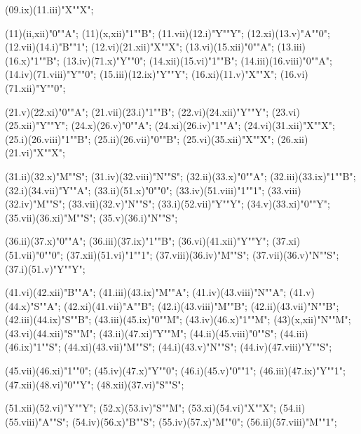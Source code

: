 \MTinput(09.ix)(11.iii)"X""X";

\MTauto(11)(ii,xii)"0""A";
\MTauto(11)(x,xii)"1""B";
\MTinput(11.vii)(12.i)"Y""Y";
\MTinput(12.xi)(13.v)"A""0";
\MTinput(12.vii)(14.i)"B""1";
\MTinput(12.vi)(21.xii)"X""X";
\MTinput(13.vi)(15.xii)"0""A";
\MTinput(13.iii)(16.x)"1""B";
\MTinput(13.iv)(71.x)"Y""0";
\MTinput(14.xii)(15.vi)"1""B";
\MTinput(14.iii)(16.viii)"0""A";
\MTinput(14.iv)(71.viii)"Y""0";
\MTinput(15.iii)(12.ix)"Y""Y";
\MTinput(16.xi)(11.v)"X""X";
\MTinput(16.vi)(71.xii)"Y""0";

\MTinput(21.v)(22.xi)"0""A";
\MTinput(21.vii)(23.i)"1""B";
\MTinput(22.vi)(24.xii)"Y""Y";
\MTinput(23.vi)(25.xii)"Y""Y";
\MTinput(24.x)(26.v)"0""A";
\MTinput(24.xi)(26.iv)"1""A";
\MTinput(24.vi)(31.xii)"X""X";
\MTinput(25.i)(26.viii)"1""B";
\MTinput(25.ii)(26.vii)"0""B";
\MTinput(25.vi)(35.xii)"X""X";
\MTinput(26.xii)(21.vi)"X""X";

\MTinput(31.ii)(32.x)"M""S";
\MTinput(31.iv)(32.viii)"N""S";
\MTinput(32.ii)(33.x)"0""A";
\MTinput(32.iii)(33.ix)"1""B";
\MTinput(32.i)(34.vii)"Y""A";
\MTinput(33.ii)(51.x)"0""0";
\MTinput(33.iv)(51.viii)"1""1";
\MTinput(33.viii)(32.iv)"M""S";
\MTinput(33.vii)(32.v)"N""S";
\MTinput(33.i)(52.vii)"Y""Y";
\MTinput(34.v)(33.xi)"0""Y";
\MTinput(35.vii)(36.xi)"M""S";
\MTinput(35.v)(36.i)"N""S";

\MTinput(36.ii)(37.x)"0""A";
\MTinput(36.iii)(37.ix)"1""B";
\MTinput(36.vi)(41.xii)"Y""Y";
\MTinput(37.xi)(51.vii)"0""0";
\MTinput(37.xii)(51.vi)"1""1";
\MTinput(37.viii)(36.iv)"M""S";
\MTinput(37.vii)(36.v)"N""S";
\MTinput(37.i)(51.v)"Y""Y";

\MTinput(41.vi)(42.xii)"B""A";
\MTinput(41.iii)(43.ix)"M""A";
\MTinput(41.iv)(43.viii)"N""A";
\MTinput(41.v)(44.x)"S""A";
\MTinput(42.xi)(41.vii)"A""B";
\MTinput(42.i)(43.viii)"M""B";
\MTinput(42.ii)(43.vii)"N""B";
\MTinput(42.iii)(44.ix)"S""B";
\MTinput(43.iii)(45.ix)"0""M";
\MTinput(43.iv)(46.x)"1""M";
\MTauto(43)(x,xii)"N""M";
\MTinput(43.vi)(44.xii)"S""M";
\MTinput(43.ii)(47.xi)"Y""M";
\MTinput(44.ii)(45.viii)"0""S";
\MTinput(44.iii)(46.ix)"1""S";
\MTinput(44.xi)(43.vii)"M""S";
\MTinput(44.i)(43.v)"N""S";
\MTinput(44.iv)(47.viii)"Y""S";

\MTinput(45.vii)(46.xi)"1""0";
\MTinput(45.iv)(47.x)"Y""0";
\MTinput(46.i)(45.v)"0""1";
\MTinput(46.iii)(47.ix)"Y""1";
\MTinput(47.xii)(48.vi)"0""Y";
\MTinput(48.xii)(37.vi)"S""S";

\MTinput(51.xii)(52.vi)"Y""Y";
\MTinput(52.x)(53.iv)"S""M";
\MTinput(53.xi)(54.vi)"X""X";
\MTinput(54.ii)(55.viii)"A""S";
\MTinput(54.iv)(56.x)"B""S";
\MTinput(55.iv)(57.x)"M""0";
\MTinput(56.ii)(57.viii)"M""1";


